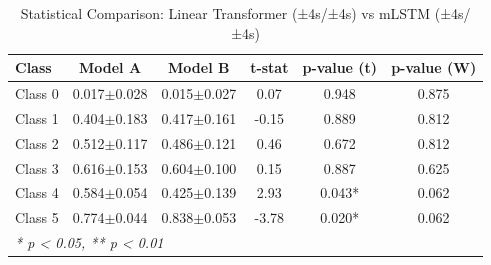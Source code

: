 \begin{table}[htbp]
\centering
\caption{Statistical Comparison: Linear Transformer (±4s/±4s) vs mLSTM (±4s/±4s)}
\label{tab:comparison_class_linear_transformer_±4s_±4s_vs_mlstm_±4s_±4s}
\begin{tabular}{lccccc}
\toprule
\textbf{Class} & \textbf{Model A} & \textbf{Model B} & \textbf{t-stat} & \textbf{p-value (t)} & \textbf{p-value (W)} \\
\midrule
Class 0 & 0.017$\pm$0.028 & 0.015$\pm$0.027 & 0.07 & 0.948 & 0.875 \\
Class 1 & 0.404$\pm$0.183 & 0.417$\pm$0.161 & -0.15 & 0.889 & 0.812 \\
Class 2 & 0.512$\pm$0.117 & 0.486$\pm$0.121 & 0.46 & 0.672 & 0.812 \\
Class 3 & 0.616$\pm$0.153 & 0.604$\pm$0.100 & 0.15 & 0.887 & 0.625 \\
Class 4 & 0.584$\pm$0.054 & 0.425$\pm$0.139 & 2.93 & 0.043* & 0.062 \\
Class 5 & 0.774$\pm$0.044 & 0.838$\pm$0.053 & -3.78 & 0.020* & 0.062 \\
\bottomrule
\multicolumn{6}{l}{\textit{* p < 0.05, ** p < 0.01}} \\
\end{tabular}
\end{table}